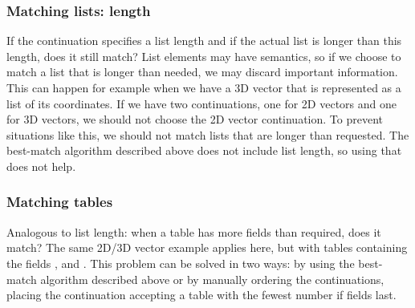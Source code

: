 
\subsubsection{Matching lists: length}
If the continuation specifies a list length and if the actual list is longer than this length, does it still match? List elements may have semantics, so if we choose to match a list that is longer than needed, we may discard important information. This can happen for example when we have a 3D vector that is represented as a list of its coordinates. If we have two continuations, one for 2D vectors and one for 3D vectors, we should not choose the 2D vector continuation. To prevent situations like this, we should not match lists that are longer than requested. The best-match algorithm described above does not include list length, so using that does not help.


\subsubsection{Matching tables}
Analogous to list length: when a table has more fields than required, does it match? The same 2D/3D vector example applies here, but with tables containing the fields ,  and .
This problem can be solved in two ways: by using the best-match algorithm described above or by manually ordering the continuations, placing the continuation accepting a table with the fewest number if fields last.
